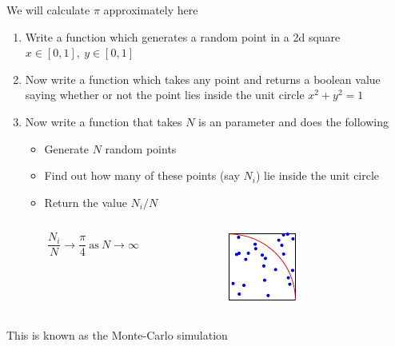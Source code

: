 \begin{frame}[fragile]
    \begin{exercise}
        We will calculate $\pi$ approximately here
        \begin{enumerate}
            \item Write a function  which generates a random point in a 2d square $x \in [0,1],\ y \in [0,1]$\\
            \item<2-> Now write a function  which takes any point and returns a boolean value saying whether or not the point lies inside the unit circle $x^2+y^2=1$
            \item<3-> Now write a function  that takes $N$ is an parameter and does the following
            \begin{itemize}
                \item Generate $N$ random points
                \item Find out how many of these points (say $N_i$) lie inside the unit circle
                \item Return the value $N_i/N$
            \end{itemize}
        \end{enumerate}
        \begin{columns}
            \begin{column}{0.5\linewidth}
                \begin{equation*}
                    \frac{N_i}{N} \to \frac{\pi}{4}\ \text{as}\ N \to \infty
                \end{equation*}
            \end{column}
            \begin{column}{0.5\linewidth}
                \begin{figure}
                    \centering
                    \includegraphics{figures/monte_carlo_pi}
                \end{figure}
            \end{column}
        \end{columns}
        This is known as the Monte-Carlo simulation
    \end{exercise}
\end{frame}

